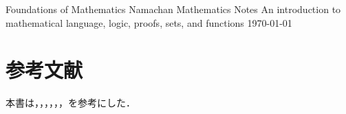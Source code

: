 \documentclass{mathnote}
\begin{document}
\tituloum
  {Foundations of Mathematics}
  {Namachan}
  {Mathematics Notes}
  {An introduction to mathematical language, logic, proofs, sets, and functions}
  {\today}

%

\cleardoublepage
{}
\pagecolor{white}

\localtableofcontents








\clearpage



\part*{参考文献}

\noindent
本書は\cite{sugiura1}，\cite{nakajima}，\cite{kaneko}，\cite{arai}，\cite{saito}，\cite{akasetsuya}，\cite{sakiyama2023}を参考にした．

\medskip

\printbibliography[heading=none]

\clearpage
\thispagestyle{empty}
\setcounter{section}{6}
\renewcommand{\indexname}{索引}

\begingroup
  \let\section\part
  \pagestyle{empty}
  \printindex
\endgroup


\end{document}
